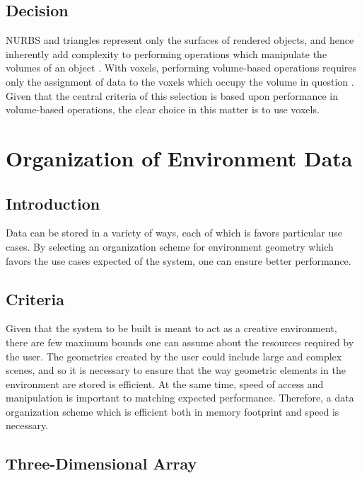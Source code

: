 \documentclass[onecolumn, draftclsnofoot,10pt, compsoc]{IEEEtran}
\begin{document}
\subsection{Decision}

NURBS and triangles represent only the surfaces of rendered objects, and hence inherently add complexity to performing operations which manipulate the volumes of an object \cite{1}. With voxels, performing volume-based operations requires only the assignment of data to the voxels which occupy the volume in question \cite{1}. Given that the central criteria of this selection is based upon performance in volume-based operations, the clear choice in this matter is to use voxels. 


\section{Organization of Environment Data}
\subsection{Introduction}

Data can be stored in a variety of ways, each of which is favors particular use cases. 
By selecting an organization scheme for environment geometry which favors the use cases expected of the system, one can ensure better performance.


\subsection{Criteria}

Given that the system to be built is meant to act as a creative environment, there are few maximum bounds one can assume about the resources required by the user.
The geometries created by the user could include large and complex scenes, and so it is necessary to ensure that the way geometric elements in the environment are stored is efficient.
At the same time, speed of access and manipulation is important to matching expected performance.
Therefore, a data organization scheme which is efficient both in memory footprint and speed is necessary.


\subsection{Three-Dimensional Array}
\end{document}
